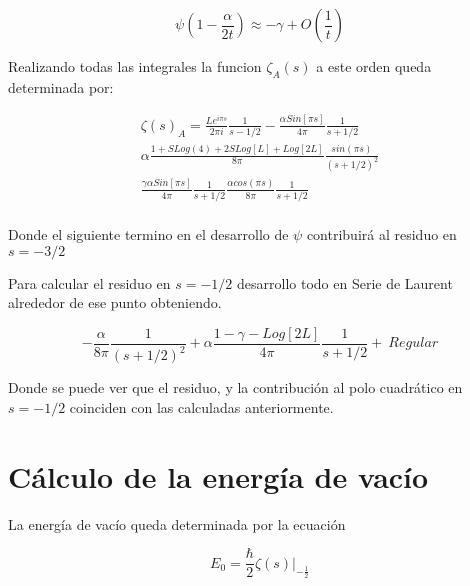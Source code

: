 \begin{equation}
    \psi(1-\frac{\alpha}{2 t}) \approx 
    -\gamma + O(\frac{1}{t})
\end{equation}

Realizando todas las integrales la funcion $ \zeta _A (s)$ a este orden queda determinada por:  

\begin{equation}
\begin{array}{c}
    \zeta (s) _{A} = 
    \frac{L e ^{i \pi s}}{2 \pi i} \frac{1}{s-1/2} 
    -\frac{\alpha Sin[\pi s]}{4 \pi} \frac{1}{s+1/2} \\
    \alpha 
    \frac{
    1+S Log(4)+2SLog[L]+Log[2L]
    }
    {8 \pi} \frac{sin(\pi s)}{(s+1/2) ^2}  \\
    \frac{\gamma \alpha Sin[\pi s]}{4 \pi } \frac{1}{s+1/2} 
    \frac{\alpha cos(\pi s) }{8 \pi}  \frac{1}{s+1/2}  \\
\end{array}
\end{equation}

Donde el siguiente termino en el desarrollo de $ \psi $ contribuirá al residuo en $s = -3/2$

Para calcular el residuo en $s=-1/2$ desarrollo todo en Serie de Laurent alrededor de ese punto obteniendo.

\begin{equation}
    - \frac{\alpha}{8 \pi} \frac{1}{(s+1/2)^2} + 
    \alpha \frac{1-\gamma -Log[2 L]}{4 \pi} \frac{1}{s+1/2} + \ Regular
\label{eq.desarrollo}
\end{equation}

Donde se puede ver que el residuo, y la contribución al polo cuadrático en $s=-1/2$ coinciden con las calculadas anteriormente.


\section{Cálculo de la energía de vacío}

La energía de vacío queda determinada por la ecuación 

\begin{equation}
    E _0 = \frac{\hbar}{2}  
    \zeta (s)  |  _{- \frac{1}{2}}
\end{equation}

